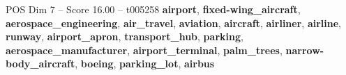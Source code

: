 \begin{textsample}{POS Dim 7 – Score 16.00 – t005258}  \label{ex:f7_pos_034}
\textbf{airport}, \textbf{fixed-wing\_aircraft}, \textbf{aerospace\_engineering}, \textbf{air\_travel}, \textbf{aviation}, \textbf{aircraft}, \textbf{airliner}, \textbf{airline}, \textbf{runway}, \textbf{airport\_apron}, \textbf{transport\_hub}, \textbf{parking}, \textbf{aerospace\_manufacturer}, \textbf{airport\_terminal}, \textbf{palm\_trees}, \textbf{narrow-body\_aircraft}, \textbf{boeing}, \textbf{parking\_lot}, \textbf{airbus}

\end{textsample}
